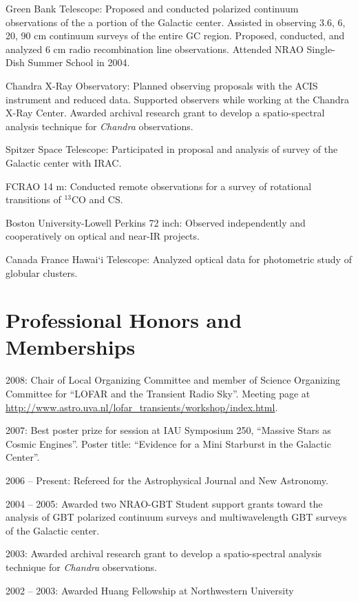 \documentclass[12pt]{article}
\begin{document}
Green Bank Telescope:  Proposed and conducted polarized continuum observations of the a portion of the Galactic center.  Assisted in observing 3.6, 6, 20, 90 cm continuum surveys of the entire GC region.  Proposed, conducted, and analyzed 6 cm radio recombination line observations.  Attended NRAO Single-Dish Summer School in 2004.

Chandra X-Ray Observatory:  Planned observing proposals with the ACIS instrument and reduced data.  Supported observers while working at the Chandra X-Ray Center.  Awarded archival research grant to develop a spatio-spectral analysis technique for \emph{Chandra} observations.

Spitzer Space Telescope:  Participated in proposal and analysis of survey of the Galactic center with IRAC.

FCRAO 14 m:  Conducted remote observations for a survey of rotational transitions of $^{13}$CO and CS.

Boston University-Lowell Perkins 72 inch:  Observed independently and cooperatively on optical and near-IR projects.

Canada France Hawai`i Telescope:  Analyzed optical data for photometric study of globular clusters.

\section{Professional Honors and Memberships}
\indent

2008:  Chair of Local Organizing Committee and member of Science Organizing Committee for ``LOFAR and the Transient Radio Sky''.  Meeting page at \url{http://www.astro.uva.nl/lofar_transients/workshop/index.html}.

2007:  Best poster prize for session at IAU Symposium 250, ``Massive Stars as Cosmic Engines''.  Poster title:  ``Evidence for a Mini Starburst in the Galactic Center''.

2006 -- Present:   Refereed for the Astrophysical Journal and New Astronomy.

2004 -- 2005:  Awarded two NRAO-GBT Student support grants toward the analysis of GBT polarized continuum surveys and multiwavelength GBT surveys of the Galactic center.

2003:  Awarded archival research grant to develop a spatio-spectral analysis technique for \emph{Chandra} observations.

2002 -- 2003:  Awarded Huang Fellowship at Northwestern University
\end{document}
